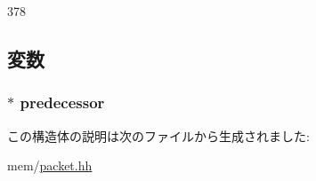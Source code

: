 \begin{DoxyCode}
378 {}
\end{DoxyCode}


\subsection{変数}
\hypertarget{structPacket_1_1SenderState_aad46f26edbbfb9590a22fdf58ff18d84}{
\subsubsection[{predecessor}]{$\ast$ {\bf predecessor}}}
\label{structPacket_1_1SenderState_aad46f26edbbfb9590a22fdf58ff18d84}


この構造体の説明は次のファイルから生成されました:\begin{DoxyCompactItemize}
\item 
mem/\hyperlink{packet_8hh}{packet.hh}\end{DoxyCompactItemize}
